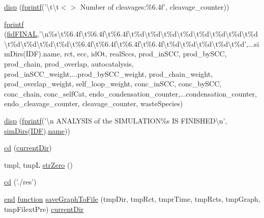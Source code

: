 \begin{DoxyCompactItemize}
\item 
\hyperlink{a00028_addecf583f3edbdfaa0e69cb8a9bb6586}{disp} (\hyperlink{a00068_aa6dc40efe43a338c9ff278260d95b4d9}{fprintf}('\textbackslash{}t\textbackslash{}t$<$$>$ Number of cleavages\-:\%6.\-4f', cleavage\-\_\-counter))
\item 
\hyperlink{a00028_af79a1146c94c3bcca287ad78df8a0c42}{fprintf} (\hyperlink{a00028_a2f1bf22f6a0c3f5791577061e92c0433}{fid\-F\-I\-N\-A\-L},'\textbackslash{}n\%s\textbackslash{}t\%6.\-4f\textbackslash{}t\%6.\-4f\textbackslash{}t\%6.\-4f\textbackslash{}t\%d\textbackslash{}t\%d\textbackslash{}t\%d\textbackslash{}t\%d\textbackslash{}t\%d\textbackslash{}t\%d\textbackslash{}t\%d\textbackslash{}t\%d\textbackslash{}t\%d\textbackslash{}t\%d\textbackslash{}t\%d\textbackslash{}t\%d\textbackslash{}t\%6.\-4f\textbackslash{}t\%6.\-4f\textbackslash{}t\%6.\-4f\textbackslash{}t\%6.\-4f\textbackslash{}t\%d\textbackslash{}t\%d\textbackslash{}t\%d\textbackslash{}t\%d\textbackslash{}t\%d',...\-sim\-Dirs(\-I\-D\-F).\-name, rct, ecc, id\-Ot, real\-Sccs, prod\-\_\-in\-S\-C\-C, prod\-\_\-by\-S\-C\-C, prod\-\_\-chain, prod\-\_\-overlap, autocatalysis, prod\-\_\-in\-S\-C\-C\-\_\-weight,...\-prod\-\_\-by\-S\-C\-C\-\_\-weight, prod\-\_\-chain\-\_\-weight, prod\-\_\-overlap\-\_\-weight, self\-\_\-loop\-\_\-weight, conc\-\_\-in\-S\-C\-C, conc\-\_\-by\-S\-C\-C, conc\-\_\-chain, conc\-\_\-self\-Cat, endo\-\_\-condensation\-\_\-counter,...\-condensation\-\_\-counter, endo\-\_\-cleavage\-\_\-counter, cleavage\-\_\-counter, waste\-Species)
\item 
\hyperlink{a00028_ae78f56c55593a2ad4cf7d0cb6d0d1b9c}{disp} (\hyperlink{a00068_aa6dc40efe43a338c9ff278260d95b4d9}{fprintf}('\textbackslash{}n A\-N\-A\-L\-Y\-S\-I\-S of the S\-I\-M\-U\-L\-A\-T\-I\-O\-N\%s I\-S F\-I\-N\-I\-S\-H\-E\-D\textbackslash{}n', \hyperlink{a00031_aae5035eb84b89176ed5b06e136325eff}{sim\-Dirs}(\hyperlink{a00028_a8acdc1bee73718b1ffcfc7eb26968f48}{I\-D\-F}).\hyperlink{a00027_abbf559a76fab59203496b0847ab9502a}{name}))
\item 
\hyperlink{a00028_a4241e59001a956990321a269c236c993}{cd} (\hyperlink{a00031_af32eb97339f1e9d37b5540de2cbc79c9}{current\-Dir})
\item 
tmpl, tmp\-L \hyperlink{a00028_a28aa31ca6f19c013204a5cc60a75f0e0}{str\-Zero} ()
\item 
\hyperlink{a00028_a63abbca9e6cf3cec70e15675cb03913f}{cd} ('./res')
\item 
\hyperlink{a00025_afb358f48b1646c750fb9da6c6585be2b}{end} \hyperlink{a00068_a4b4c670b101bf7a838f775e008fa6255}{function} \hyperlink{a00028_a4436ee01db317f5aca8999e75f24e581}{save\-Graph\-To\-File} (tmp\-Dir, tmp\-Rct, tmpr\-Time, tmp\-Rcts, tmp\-Graph, tmp\-Filext\-Pre) \hyperlink{a00031_af32eb97339f1e9d37b5540de2cbc79c9}{current\-Dir}
$$
\end{DoxyCompactItemize}
